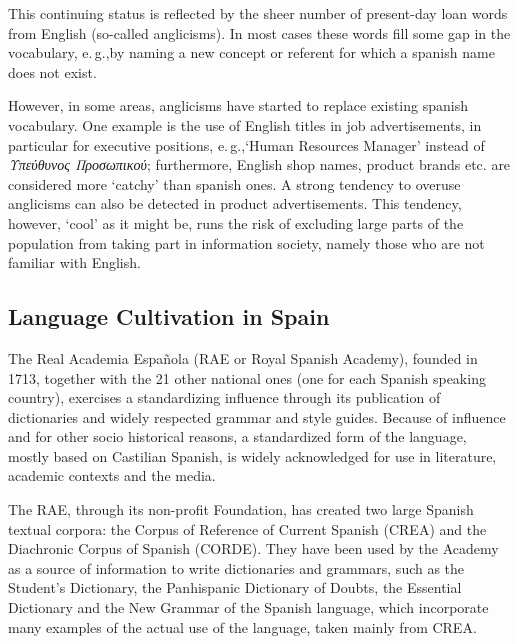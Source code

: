 \begin{multicols}{2}
This continuing status is reflected by the sheer number of present-day loan words from English (so-called anglicisms). In most cases these words fill some gap in the vocabulary, e.\,g.,by naming a new concept or referent for which a spanish name does not exist.

However, in some areas, anglicisms have started to replace existing spanish vocabulary. One example is the use of English titles in job advertisements, in particular for executive positions, e.\,g.,‘Human Resources Manager’ instead of \textit{Υπεύθυνος Προσωπικού}; furthermore, English shop names, product brands etc. are considered more ‘catchy’ than spanish ones. A strong tendency to overuse anglicisms can also be detected in product advertisements. This tendency, however, ‘cool’ as it might be, runs the risk of excluding large parts of the population from taking part in information society, namely those who are not familiar with English.

\subsection{Language Cultivation in Spain}

The Real Academia Española (RAE or Royal Spanish Academy), founded in 1713, together with the 21 other national ones (one for each Spanish speaking country), exercises a standardizing influence through its publication of dictionaries and widely respected grammar and style guides. Because of influence and for other socio historical reasons, a standardized form of the language, mostly based on Castilian Spanish, is widely acknowledged for use in literature, academic contexts and the media. 


The RAE, through its non-profit Foundation, has created two large Spanish textual corpora: the  Corpus of Reference of Current Spanish (CREA) and the Diachronic Corpus of Spanish (CORDE). They have been used by the Academy as a source of  information to write dictionaries and grammars, such as the Student's Dictionary, the Panhispanic Dictionary of Doubts, the Essential Dictionary and the New Grammar of the Spanish language, which incorporate many examples of the actual use of the  language, taken mainly from CREA. 


\end{multicols}
